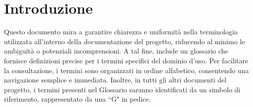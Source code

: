 \section{Introduzione}
Questo documento mira a garantire chiarezza e uniformità nella terminologia utilizzata all'interno della documentazione del progetto, riducendo al minimo le ambiguità o potenziali incomprensioni. A tal fine, include un glossario che fornisce definizioni precise per i termini specifici del dominio d'uso.
Per facilitare la consultazione, i termini sono organizzati in ordine alfabetico, consentendo una navigazione semplice e immediata. Inoltre, in tutti gli altri documenti del progetto, i termini presenti nel Glossario saranno identificati da un simbolo di riferimento, rappresentato da una ``G" in pedice.